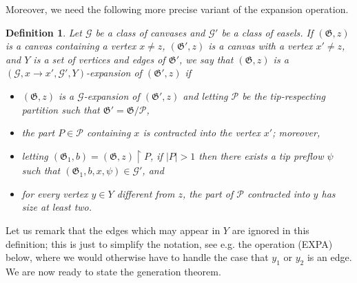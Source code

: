 \documentclass{article}
\newcommand{\PP}{\mathcal{P}}
\newcommand{\GG}{\mathcal{G}}
\newcommand\g{\mathfrak{G}}
\newtheorem{definition}[theorem]{Definition}
\begin{document}
Moreover, we need the following more precise variant of the expansion operation.

\begin{definition}
Let $\GG$ be a class of canvases and $\GG'$ be a class of easels. 
If $(\g,z)$ is a canvas containing a vertex $x\neq z$, $(\g',z)$ is a canvas with a vertex $x'\neq z$, and $Y$ is a set of vertices and edges of $\g'$, we say that
$(\g,z)$ is a \emph{$(\GG,x\to x',\GG',Y)$-expansion} of $(\g',z)$ if
\begin{itemize}
\item $(\g,z)$ is a $\GG$-expansion of $(\g',z)$ and letting $\PP$ be the tip-respecting partition such that $\g'=\g/\PP$,
\item the part $P\in \PP$ containing $x$ is contracted into the vertex $x'$; moreover,
\item letting $(\g_1,b)=(\g,z)\restriction P$, if $|P|>1$ then there exists a tip preflow $\psi$ such that $(\g_1,b,x,\psi)\in \GG'$, and
\item for every \emph{vertex} $y\in Y$ different from $z$, the part of $\PP$ contracted into $y$ has size at least two.
\end{itemize}
\end{definition}

Let us remark that the edges which may appear in $Y$ are ignored in this definition; this is just to simplify the notation,
see e.g. the operation (EXPA) below, where we would otherwise have to handle the case that $y_1$ or $y_2$ is an edge.
We are now ready to state the generation theorem.
\end{document}
